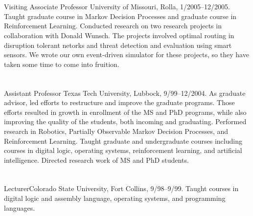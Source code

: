 \documentclass[10pt]{resume}
\begin{document}
\section{}
{Visiting Associate Professor} {University of Missouri, Rolla,
1/2005--12/2005. Taught graduate course in Markov Decision Processes and
graduate course in Reinforcement Learning.  Conducted research on two
research projects in collaboration with Donald Wunsch.  The projects
involved optimal routing in disruption tolerant netorks and threat detection
and evaluation using smart sensors.  We wrote our own event-driven simulator
for these projects, so they have taken some time to come into fruition. }

\section{}
{Assistant Professor} {Texas Tech University, Lubbock,
9/99--12/2004.  As graduate advisor, led efforts to restructure and improve
the graduate programs.  Those efforts resulted in growth in enrollment of
the MS and PhD programs, while also improving the quality of the students,
both incoming and graduating.  Performed research in Robotics, Partially
Observable Markov Decision Processes, and Reinforcement Learning.  Taught
graduate and undergraduate courses including courses in digital logic,
operating systems, reinforcement learning, and artificial intelligence.
Directed research work of MS and PhD students.}

\section{}
{Lecturer}{Colorado State University,
  Fort Collins, 9/98--9/99. Taught courses in digital
  logic and assembly language, operating systems, and programming
  languages.}
\end{document}
